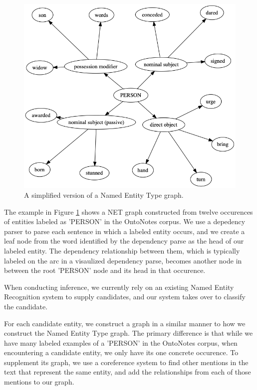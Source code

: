 \documentclass[11pt,a4paper]{article}
\begin{document}
\begin{figure}[h]
  \includegraphics[width=\linewidth]{figures/G_PERSON.png}
  \caption{A simplified version of a Named Entity Type graph.}
  \label{fig:person_graph}
\end{figure}

The example in Figure \ref{fig:person_graph} shows a NET graph constructed from twelve occurences of entities labeled as 'PERSON' in the OntoNotes corpus. We use a depedency parser to parse each sentence in which a labeled entity occurs, and we create a leaf node from the word identified by the dependency parse as the head of our labeled entity. The dependency relationship between them, which is typically labeled on the arc in a visaulized dependency parse, becomes another node in between the root 'PERSON' node and its head in that occurence.

When conducting inference, we currently rely on an existing Named Entity Recognition system to supply candidates, and our system takes over to classify the candidate.

For each candidate entity, we construct a graph in a similar manner to how we construct the Named Entity Type graph. The primary difference is that while we have many labeled examples of a 'PERSON' in the OntoNotes corpus, when encountering a candidate entity, we only have its one concrete occurence. To supplement its graph, we use a coreference system to find other mentions in the text that represent the same entity, and add the relationships from each of those mentions to our graph.
\end{document}
